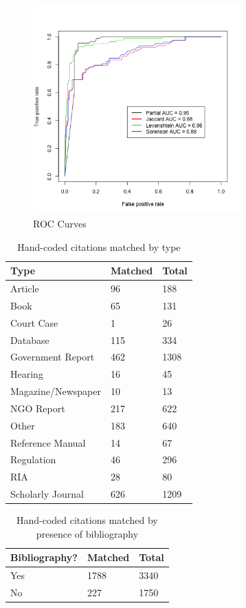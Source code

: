 \documentclass[12pt]{article}
\begin{document}
\begin{figure}
\begin{center}
\includegraphics[height=8cm]{roc_curves.png}
\caption{ROC Curves}
\label{fig:roc}
\end{center}
\end{figure}

\begin{table}[ht]
\centering
\caption{Hand-coded citations matched by type}\label{tab:focalhand}
\begin{tabular}{lll}
  \hline
  \hline
 Type & Matched & Total\\
 \hline
Article & 96 & 188 \\
Book & 65 & 131\\
Court Case & 1 & 26\\
Database & 115 & 334\\
Government Report & 462 & 1308\\
Hearing & 16 & 45\\
Magazine/Newspaper & 10 & 13\\
NGO Report & 217 & 622 \\
Other & 183 & 640\\
Reference Manual & 14 & 67\\
Regulation & 46 & 296\\
RIA & 28 & 80\\
Scholarly Journal & 626 & 1209\\
  \hline
  \hline
\end{tabular}
\end{table}

\begin{table}[ht]
\centering
\caption{Hand-coded citations matched by presence of bibliography}\label{tab:bibmatch}
\begin{tabular}{lll}
  \hline
  \hline
 Bibliography? & Matched & Total\\
 \hline
 Yes & 1788 & 3340\\
 No & 227 & 1750\\
  \hline
  \hline
\end{tabular}
\end{table}
\end{document}
